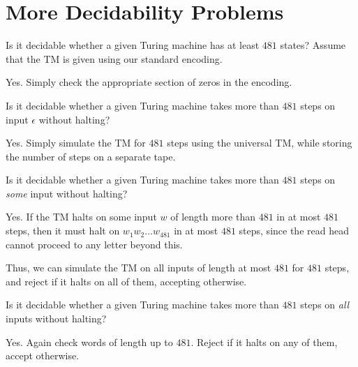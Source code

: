 \section{More Decidability Problems} \label{sec:prb:decidability}
\begin{exercise}
    Is it decidable whether a given Turing machine has at least $481$
    states?
    Assume that the TM is given using our standard encoding.
\end{exercise}
\begin{solution}
    Yes.
    Simply check the appropriate section of zeros in the encoding.
\end{solution}

\begin{exercise}
    Is it decidable whether a given Turing machine takes more than $481$
    steps on input $\epsilon$ without halting?
\end{exercise}
\begin{solution}
    Yes.
    Simply simulate the TM for $481$ steps using the universal TM,
    while storing the number of steps on a separate tape.
\end{solution}

\begin{exercise}
    Is it decidable whether a given Turing machine takes more than $481$
    steps on \emph{some} input without halting?
\end{exercise}
\begin{solution}
    Yes.
    If the TM halts on some input $w$ of length more than $481$ in at most
    $481$ steps,
    then it must halt on $w_1w_2\dots w_{481}$ in at most $481$ steps,
    since the read head cannot proceed to any letter beyond this.

    Thus, we can simulate the TM on all inputs of length at most $481$ for
    $481$ steps,
    and reject if it halts on all of them, accepting otherwise.
\end{solution}

\begin{exercise}
    Is it decidable whether a given Turing machine takes more than $481$
    steps on \emph{all} inputs without halting?
\end{exercise}
\begin{solution}
    Yes.
    Again check words of length up to $481$.
    Reject if it halts on any of them, accept otherwise.
\end{solution}

